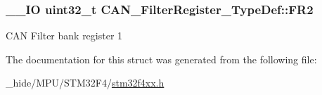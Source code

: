 \subsubsection[{F\+R2}]{\setlength{\rightskip}{0pt plus 5cm}\+\_\+\+\_\+\+I\+O uint32\+\_\+t C\+A\+N\+\_\+\+Filter\+Register\+\_\+\+Type\+Def\+::\+F\+R2}\label{struct_c_a_n___filter_register___type_def_a77959e28a302b05829f6a1463be7f800}
C\+A\+N Filter bank register 1 

The documentation for this struct was generated from the following file\+:\begin{DoxyCompactItemize}
\item 
\+\_\+hide/\+M\+P\+U/\+S\+T\+M32\+F4/\hyperlink{stm32f4xx_8h}{stm32f4xx.\+h}\end{DoxyCompactItemize}
